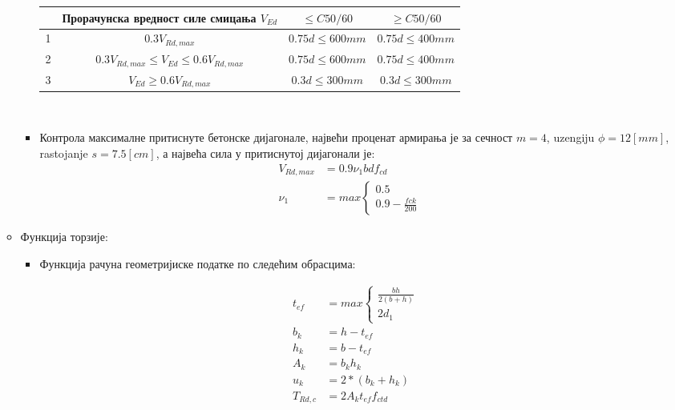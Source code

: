 \documentclass[11pt, a4paper]{article}
\begin{document}
\begin{enumerate}
\begin{itemize}
\begin{itemize}
			\begin{tabular}{|c|c|c|c|} \hline
				 &Прорачунска вредност силе смицања $V_{Ed}$ & $\leq C50/60$ & $\geq C50/60$\\ \hline
				 1 & $0.3V_{Rd,max}$ & $0.75d \leq 600mm$ & $0.75d \leq 400mm $\\ \hline
				2 & $0.3V_{Rd,max} \leq V_{Ed} \leq  0.6V_{Rd,max}$& $0.75d \leq 600mm$ & $0.75d \leq 400mm$\\ \hline
				3 &$V_{Ed} \geq 0.6V_{Rd,max} $ & $0.3d \leq 300mm$  & $0.3d \leq 300mm$\\ \hline
			\end{tabular}\\[2mm]
		
		\item Контрола максималне притиснуте бетонске дијагонале, највећи проценат армирања је за сечност $m = 4$, uzengiju $\phi = 12 [mm]$,  rastojanje $s = 7.5 [cm]$, а највећа сила у притиснутој дијагонали је:
		\begin{align*}
		V_{Rd, max} &= 0.9\nu_1 bdf_{cd}\\
		\nu_1 &=  max \left\{\begin{array}{l}
		0.5\\
		0.9 - \frac{fck}{200} \quad
			\end{array}\right.
		\end{align*}
		
		\end{itemize}
		
		\item Функција торзије:
				
		\begin{itemize}
		
		\item Функција рачуна геометријиске податке по следећим обрасцима:
		 	
		 		\begin{align*}
				t_{ef} &=	 max \left\{\begin{array}{l}
					\frac{bh}{2(b+h)}\\[2mm]
					2d_1
				\end{array} \right.\\[2mm]
				b_k &= h - t_{ef}\\
				h_k &= b - t_{ef}\\
				A_k &= b_kh_k\\
				u_k&= 2*(b_k + h_k)\\
				T_{Rd,c} &= 2A_kt_{ef}f_{ctd} 
			\end{align*}
		

\end{itemize}
\end{itemize}
\end{enumerate}
\end{document}
